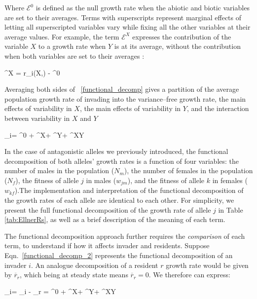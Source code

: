 \documentclass[12pt]{article}
\let\oldequation\equation
\let\oldendequation\endequation
\renewenvironment{equation}
  {\linenomathNonumbers\oldequation}
  {\oldendequation\endlinenomath}
\begin{document}
Where $\mathcal{E}^0$ is defined as the null growth rate when the abiotic and biotic variables are set to their averages. Terms with superscripts represent marginal effects of letting all superscripted variables vary while fixing all the other variables at their average values. For example, the term $\mathcal{E}^X$ expresses the contribution of the variable $X$ to a growth rate when $Y$ is at its average, without the contribution when both variables are set to their averages :

\begin{equation}
  ^{X} = r_{i}(X,) - ^{0}
\end{equation}


Averaging both sides of ~\ref{functional_decomp} gives a partition of the average population growth rate of invading into the variance--free growth rate, the main effects of variability in $X$, the main effects of variability in $Y$, and the interaction between variability in $X$ and $Y$

\begin{equation}
    _{i}= ^{0} + ^{X}+ ^{Y}+ ^{XY}
   \label{functional_decomp_2}
\end{equation}

In the case of antagonistic alleles we previously introduced, the functional decomposition of both alleles' growth rates is a function of four variables: the number of males in the population ($N_{m}$), the number of females in the population ($N_{f}$), the fitness of allele $j$ in males ($w_{jm}$), and the fitness of allele $k$ in females ($w_{kf}$).The implementation and interpretation of the functional decomposition of the growth rates of each allele are identical to each other. For simplicity,  we present the full functional decomposition of the growth rate of allele $j$ in Table \ref{tab:EllnerRs}, as well as a brief description of the meaning of each term.

The functional decomposition approach further requires the \textit{comparison} of each term, to understand if how it affects invader and residents. Suppose Eqn.~\ref{functional_decomp_2} represents the functional  decomposition of an invader $i$. An analogue decomposition of a resident $r$ growth rate would be given by $\overline{r}_{r}$, which being at steady state means $\overline{r}_{r}=0$. We therefore can express:


\begin{equation}
    _{i}= _{i} - _{r} = \Delta^{0} + \Delta^{X}+  \Delta^{Y}+ \Delta^{XY}
   \label{functional_decomp_3}
\end{equation}
\end{document}
